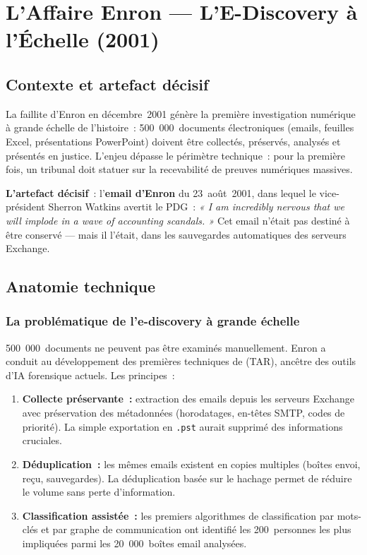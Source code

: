 \section{L'Affaire Enron --- L'E-Discovery à l'Échelle (2001)}
\label{sec:enron}

\subsection{Contexte et artefact décisif}

La faillite d'Enron en décembre~2001 génère la première investigation
numérique à grande échelle de l'histoire~: 500~000~documents électroniques
(emails, feuilles Excel, présentations PowerPoint) doivent être collectés,
préservés, analysés et présentés en justice. L'enjeu dépasse le périmètre
technique~: pour la première fois, un tribunal doit statuer sur la
recevabilité de preuves numériques massives.

\medskip

\textbf{L'artefact décisif}~: l'\textbf{email d'Enron} du 23~août~2001,
dans lequel le vice-président Sherron Watkins avertit le PDG~: \textit{« I
am incredibly nervous that we will implode in a wave of accounting
scandals. »} Cet email n'était pas destiné à être conservé --- mais il
l'était, dans les sauvegardes automatiques des serveurs Exchange.

\subsection{Anatomie technique}

\subsubsection{La problématique de l'e-discovery à grande échelle}

500~000~documents ne peuvent pas être examinés manuellement. Enron a
conduit au développement des premières techniques de
 (TAR), ancêtre des
outils d'IA forensique actuels. Les principes~:

\begin{enumerate}
    \item \textbf{Collecte préservante~:} extraction des emails depuis les
          serveurs Exchange avec préservation des métadonnées (horodatages,
          en-têtes SMTP, codes de priorité). La simple exportation en
          \texttt{.pst} aurait supprimé des informations cruciales.
    \item \textbf{Déduplication~:} les mêmes emails existent en copies
          multiples (boîtes envoi, reçu, sauvegardes). La déduplication
          basée sur le hachage permet de réduire le volume sans perte d'information.
    \item \textbf{Classification assistée~:} les premiers algorithmes de
          classification par mots-clés et par graphe de communication ont
          identifié les 200~personnes les plus impliquées parmi les
          20~000~boîtes email analysées.
\end{enumerate}

